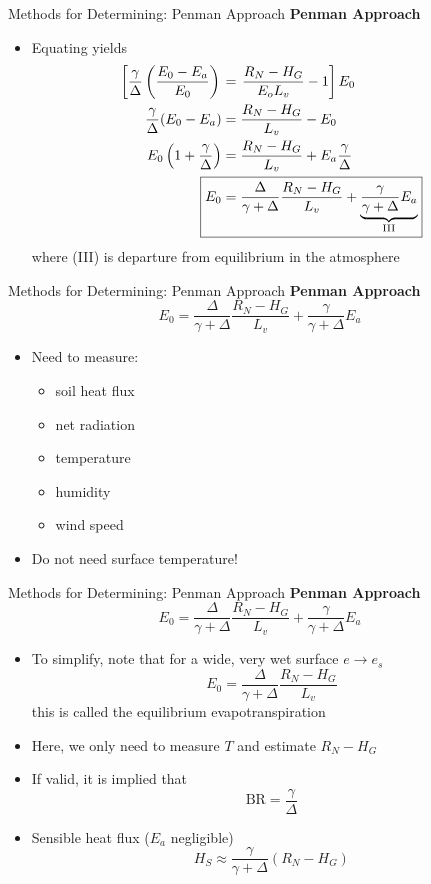 
\begin{frame}{Methods for Determining: Penman Approach}
\textbf{Penman Approach}
\begin{itemize}
	\item Equating yields
	\begin{align*}
	 \left[\frac{\gamma}{\Delta}\left(\frac{E_0-E_a}{E_0}\right)\right. &= \left.\frac{R_N - H_G}{E_o L_v} -1\right]E_0\\
\frac{\gamma}{\Delta}(E_0-E_a) &= \frac{R_N - H_G}{L_v} - E_0\\
   E_0\left(1+\frac{\gamma}{\Delta}\right) &= \frac{R_N - H_G}{L_v} + E_a\frac{\gamma}{\Delta}\\
\Aboxed{E_0 &= \frac{\Delta}{\gamma + \Delta} \frac{R_N - H_G}{L_v} + \underbrace{\frac{\gamma}{\gamma+\Delta}E_a}_{\text{III}}}
	\end{align*}
	where (III) is departure from equilibrium in the atmosphere
\end{itemize}
\end{frame}


\begin{frame}{Methods for Determining: Penman Approach}
\textbf{Penman Approach}
$$E_0 = \frac{\Delta}{\gamma + \Delta} \frac{R_N - H_G}{L_v} +\frac{\gamma}{\gamma+\Delta}E_a$$
\begin{itemize}
	\item Need to measure:
	\begin{itemize}
		\item soil heat flux
		\item net radiation
		\item temperature
		\item humidity
		\item wind speed
	\end{itemize}
	\item Do not need surface temperature!
\end{itemize}
\end{frame}

\begin{frame}{Methods for Determining: Penman Approach}
\textbf{Penman Approach}
$$E_0 = \frac{\Delta}{\gamma + \Delta} \frac{R_N - H_G}{L_v} +\frac{\gamma}{\gamma+\Delta}E_a$$
\begin{itemize}
	\item To simplify, note that for a wide, very wet surface $e\rightarrow e_s$
	$$E_0 = \frac{\Delta}{\gamma + \Delta} \frac{R_N - H_G}{L_v}$$
	this is called the equilibrium evapotranspiration
	\item Here, we only need to measure $T$ and estimate $R_N - H_G$
	\item If valid, it is implied that 
	$$\text{BR} = \frac{\gamma}{\Delta}$$
	\item Sensible heat flux ($E_a$ negligible)
	$$H_S \approx \frac{\gamma}{\gamma + \Delta}(R_N - H_G)$$
\end{itemize}
\end{frame}

